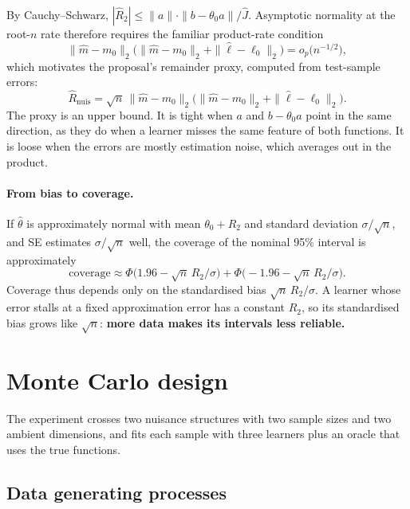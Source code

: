 \documentclass[11pt,a4paper]{article}
\newcommand{\Rnuis}{\hat R_{\mathrm{nuis}}}
\begin{document}
By Cauchy--Schwarz, $|\hat R_2|\le\|a\|\cdot\|b-\theta_0a\|/\hat J$. Asymptotic normality at the root-$n$ rate therefore requires the familiar product-rate condition
\begin{equation}\label{eq:rate}
\|\hat m-m_0\|_2\big(\|\hat m-m_0\|_2+\|\hat\ell-\ell_0\|_2\big)=o_p\big(n^{-1/2}\big),
\end{equation}
which motivates the proposal's remainder proxy, computed from test-sample errors:
\begin{equation}\label{eq:rnuis}
\Rnuis=\sqrt n\,\|\hat m-m_0\|_2\big(\|\hat m-m_0\|_2+\|\hat\ell-\ell_0\|_2\big).
\end{equation}
The proxy is an upper bound. It is tight when $a$ and $b-\theta_0a$ point in the same direction, as they do when a learner misses the same feature of both functions. It is loose when the errors are mostly estimation noise, which averages out in the product.

\paragraph{From bias to coverage.} If $\hat\theta$ is approximately normal with mean $\theta_0+R_2$ and standard deviation $\sigma/\sqrt n$, and SE estimates $\sigma/\sqrt n$ well, the coverage of the nominal 95\% interval is approximately
\begin{equation}\label{eq:cov}
\text{coverage}\approx\Phi\big(1.96-\sqrt n\,R_2/\sigma\big)+\Phi\big(-1.96-\sqrt n\,R_2/\sigma\big).
\end{equation}
Coverage thus depends only on the standardised bias $\sqrt n\,R_2/\sigma$. A learner whose error stalls at a fixed approximation error has a constant $R_2$, so its standardised bias grows like $\sqrt n$: \textbf{more data makes its intervals less reliable.}

\section{Monte Carlo design}\label{sec:design}

The experiment crosses two nuisance structures with two sample sizes and two ambient dimensions, and fits each sample with three learners plus an oracle that uses the true functions.

\subsection{Data generating processes}
\end{document}
